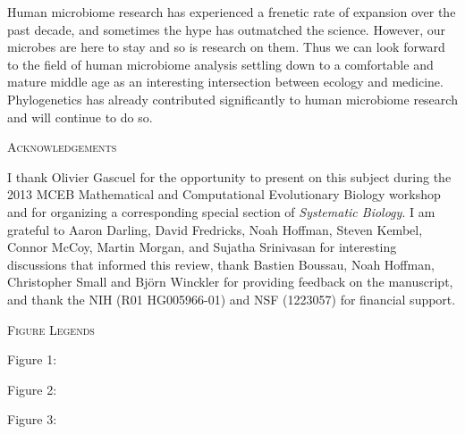 \documentclass{amsart}
\newcommand{\notforarxiv}[1]{#1}
\renewcommand{\section}[1]{%
\bigskip
\begin{center}
\begin{Large}
\normalfont\scshape #1
\medskip
\end{Large}
\end{center}}
\begin{document}
Human microbiome research has experienced a frenetic rate of expansion over the past decade, and sometimes the hype has outmatched the science.
However, our microbes are here to stay and so is research on them.
Thus we can look forward to the field of human microbiome analysis settling down to a comfortable and mature middle age as an interesting intersection between ecology and medicine.
Phylogenetics has already contributed significantly to human microbiome research and will continue to do so.



\section{Acknowledgements}
I thank Olivier Gascuel for the opportunity to present on this subject during the 2013 MCEB Mathematical and Computational Evolutionary Biology workshop and for organizing a corresponding special section of \textit{Systematic Biology}.
I am grateful to Aaron Darling, David Fredricks, Noah Hoffman, Steven Kembel, Connor McCoy, Martin Morgan, and Sujatha Srinivasan for interesting discussions that informed this review, thank Bastien Boussau, Noah Hoffman, Christopher Small and Bj\"orn Winckler for providing feedback on the manuscript, and thank the NIH (R01 HG005966-01) and NSF (1223057) for financial support.


\notforarxiv{
\newpage
\section{Figure Legends}

\noindent
Figure 1: \pdLegend

\noindent
Figure 2: \unifracLegend

\noindent
Figure 3: \dirtpilesLegend


\newpage
}



\end{document}
